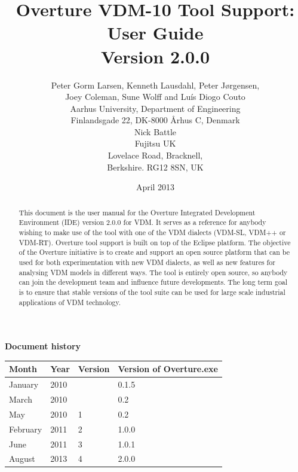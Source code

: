 \documentclass{overturerepchap}
\begin{document}
\title{Overture VDM-10 Tool Support: User Guide \\{\large Version 2.0.0}}
\author{Peter Gorm Larsen, Kenneth Lausdahl, Peter J\o{}rgensen,\\ Joey Coleman, Sune Wolff and  Lu\'{i}s Diogo Couto \\
Aarhus University, Department of Engineering\\
Finlandsgade 22, DK-8000 \AA{}rhus C, Denmark\\[3mm]
Nick Battle\\
Fujitsu UK\\
Lovelace Road, Bracknell, \\
Berkshire. RG12 8SN, UK}

\date{April 2013}


\maketitle


\textbf{Document history}

\begin{tabular}{|l|l|l|l|}\hline
Month   & Year & Version & Version of Overture.exe \\ \hline
January & 2010 &         & 0.1.5 \\ \hline
March   & 2010 &         & 0.2   \\ \hline
May     & 2010 & 1       & 0.2   \\ \hline
February& 2011 & 2       & 1.0.0   \\ \hline
June    & 2011 & 3       & 1.0.1   \\ \hline
August  & 2013 & 4       & 2.0.0 \\ \hline
\end{tabular}

\tableofcontents

\begin{abstract}
This document is the user manual for the Overture Integrated Development
Environment (IDE) version 2.0.0 for
VDM. It serves as a reference for anybody wishing to make use of
the tool with one of the VDM dialects (VDM-SL, VDM++ or VDM-RT).
Overture tool support is built on top of the Eclipse platform. The
objective of the Overture initiative is to create and support an open source
platform that can be used for both experimentation with new VDM dialects,
as well as new features for analysing VDM
models in different ways. The tool is entirely open source, so anybody
can join the development team and influence future
developments. The long term goal is to ensure that stable
versions of the tool suite can be used for large scale industrial
applications of VDM technology.
\end{abstract}
\end{document}
